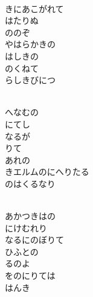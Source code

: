 \documentclass[10pt,b5j]{tarticle} %
\begin{document}
\vspace{1.5em} %
\newcommand{\linespace}{0.5em} %
\newcommand{\blocksize}{0.5\hsize} %
\newcommand{\itemmargin}{6em} %
\begin{enumerate} %
    \setlength{\itemindent}{\itemmargin} %
    \begin{minipage}[c]{\blocksize}
    
        \vspace{\linespace}
        \item~\\
        きにあこがれて\\
        はたりぬ\\
        ののぞ\\
        やはらかきの\\
        はしきの\\
        のくねて\\
        らしきびにつ
        
        \vspace{\linespace}
        \item~\\
        へなむの\\
        にてし\\
        なるが\\
        りて\\
        あれの\\
        きエルムのにへりたる\\
        のはくるなり
        
        \vspace{\linespace}
        \item~\\
        あかつきはの\\
        にけむれり\\
        なるにのぼりて\\
        ひふとの\\
        るのよ\\
        をのにりては\\
        はんき
        

\end{minipage}
\end{enumerate}
\end{document}
